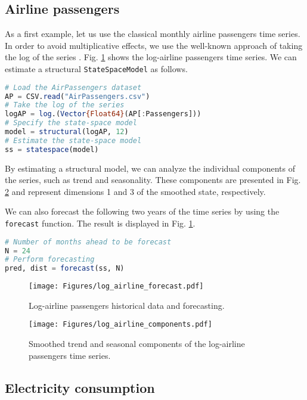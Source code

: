 \documentclass{juliacon}
\begin{document}
\subsection{Airline passengers}

As a first example, let us use the classical monthly airline passengers time series. In order to avoid multiplicative effects, we use the well-known approach of taking the log of the series \cite{lutkepohl2012role}. Fig. \ref{fig:log_airline_forecast} shows the log-airline passengers time series. We can estimate a structural \texttt{StateSpaceModel} as follows.
%
\begin{lstlisting}[language = Julia]
# Load the AirPassengers dataset
AP = CSV.read("AirPassengers.csv")
# Take the log of the series
logAP = log.(Vector{Float64}(AP[:Passengers]))
# Specify the state-space model
model = structural(logAP, 12)
# Estimate the state-space model
ss = statespace(model)
\end{lstlisting}

By estimating a structural model, we can analyze the individual components of the series, such as trend and seasonality. These components are presented in Fig. \ref{fig:log_airline_components} and represent dimensions 1 and 3 of the smoothed state, respectively.

We can also forecast the following two years of the time series by using the \texttt{forecast} function. The result is displayed in Fig. \ref{fig:log_airline_forecast}.
%
\begin{lstlisting}[language = Julia]
# Number of months ahead to be forecast
N = 24
# Perform forecasting
pred, dist = forecast(ss, N)
\end{lstlisting}
%
\begin{figure}[h]
	\centering
	\texttt{[image: Figures/log\_airline\_forecast.pdf]}
	\caption{Log-airline passengers historical data and forecasting.}
	\label{fig:log_airline_forecast}
\end{figure}
%
\begin{figure}[h]
	\centering
	\texttt{[image: Figures/log\_airline\_components.pdf]}
	\caption{Smoothed trend and seasonal components of the log-airline passengers time series.}
	\label{fig:log_airline_components}
\end{figure}

\subsection{Electricity consumption}
\end{document}
